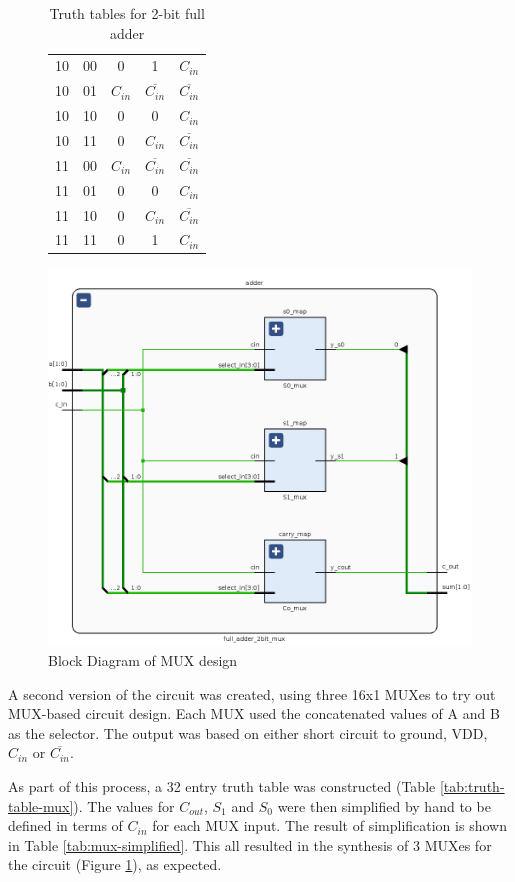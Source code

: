 \documentclass[12pt]{article}
\begin{document}
\begin{table}[H]
\begin{subfigure}{0.4\linewidth}
\begin{tabular}{c c | c c c}
            10  & 00  & 0         & 1                   & $C_{in}$            \\
            10  & 01  & $C_{in}$  & $\overline{C_{in}}$ & $\overline{C_{in}}$ \\
            10  & 10  & 0         & 0                   & $C_{in}$            \\
            10  & 11  & 0         & $C_{in}$            & $\overline{C_{in}}$ \\
            11  & 00  & $C_{in}$  & $\overline{C_{in}}$ & $\overline{C_{in}}$ \\
            11  & 01  & 0         & 0                   & $C_{in}$            \\
            11  & 10  & 0         & $C_{in}$            & $\overline{C_{in}}$ \\
            11  & 11  & 0         & 1                   & $C_{in}$            \\
            \bottomrule
        \end{tabular}
    \end{subfigure}
    \caption{Truth tables for 2-bit full adder}
\end{table}

\begin{figure}[h]
    \centering
    \includegraphics[width=0.6\linewidth]{mux-schematic.png}
    \caption{Block Diagram of MUX design}
    \label{fig:mux-schematic}
\end{figure}

A second version of the circuit was created, using three 16x1 MUXes to try out MUX-based circuit design.
Each MUX used the concatenated values of A and B as the selector.
The output was based on either short circuit to ground, VDD, $C_{in}$ or $\overline{C_{in}}$.

As part of this process, a 32 entry truth table was constructed (Table \ref{tab:truth-table-mux}).
The values for $C_{out}$, $S_1$ and $S_0$ were then simplified by hand to be defined in terms of $C_{in}$ for each MUX input.
The result of simplification is shown in Table \ref{tab:mux-simplified}.
This all resulted in the synthesis of 3 MUXes for the circuit (Figure \ref{fig:mux-schematic}), as expected.
\end{document}
